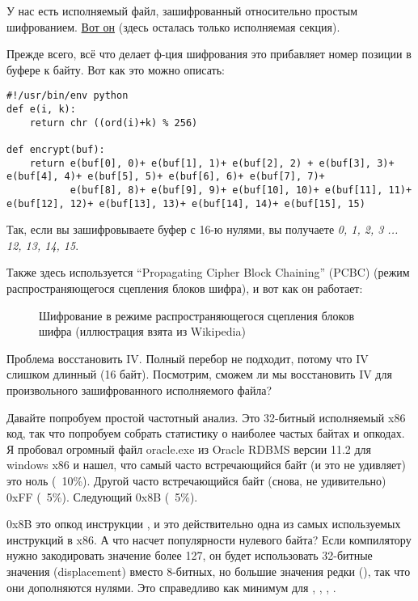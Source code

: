
У нас есть исполняемый файл, зашифрованный относительно простым шифрованием.
\href{\RepoURL/examples/simple_exec_crypto/files/cipher.bin}{Вот он} (здесь осталась только исполняемая секция).

Прежде всего, всё что делает ф-ция шифрования это прибавляет номер позиции в буфере к байту.
Вот как это можно описать:

\begin{lstlisting}[caption=Скрипт на Питоне,style=custompy]
#!/usr/bin/env python
def e(i, k):
    return chr ((ord(i)+k) % 256)

def encrypt(buf):
    return e(buf[0], 0)+ e(buf[1], 1)+ e(buf[2], 2) + e(buf[3], 3)+ e(buf[4], 4)+ e(buf[5], 5)+ e(buf[6], 6)+ e(buf[7], 7)+
           e(buf[8], 8)+ e(buf[9], 9)+ e(buf[10], 10)+ e(buf[11], 11)+ e(buf[12], 12)+ e(buf[13], 13)+ e(buf[14], 14)+ e(buf[15], 15)
\end{lstlisting}

Так, если вы зашифровываете буфер с 16-ю нулями, вы получаете \emph{0, 1, 2, 3 ... 12, 13, 14, 15}.

Также здесь используется ``Propagating Cipher Block Chaining'' (PCBC) (режим распространяющегося сцепления блоков шифра),
и вот как он работает:

\begin{figure}[H]
\centering
{}
\caption{Шифрование в режиме распространяющегося сцепления блоков шифра (иллюстрация взята из Wikipedia)}
\end{figure}

Проблема восстановить \ac{IV}.
Полный перебор не подходит, потому что \ac{IV} слишком длинный (16 байт).
Посмотрим, сможем ли мы восстановить \ac{IV} для произвольного зашифрованного исполняемого файла?

Давайте попробуем простой частотный анализ.
Это 32-битный исполняемый x86 код, так что попробуем собрать статистику о наиболее частых байтах и опкодах.
Я пробовал огромный файл oracle.exe из Oracle RDBMS версии 11.2 для windows x86 и нашел, что самый часто встречающийся байт 
(и это не удивляет) это ноль (~10\%).
Другой часто встречающийся байт (снова, не удивительно) 0xFF (~5\%).
Следующий 0x8B (~5\%).

0x8B это опкод инструкции , и это действительно одна из самых используемых инструкций в x86.
А что насчет популярности нулевого байта?
Если компилятору нужно закодировать значение более 127, он будет использовать 32-битные значения (displacement) вместо 8-битных,
но большие значения редки (), так что они дополняются нулями.
Это справедливо как минимум для , , , .

